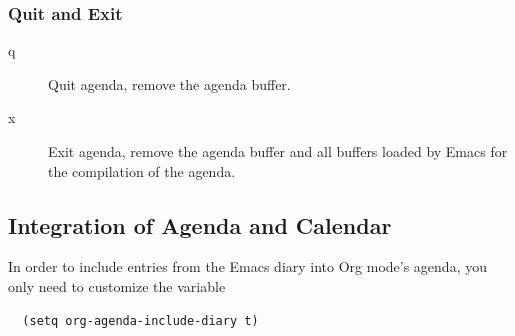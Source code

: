 \subsubsection{Quit and Exit}
\begin{description}
\item [q] Quit agenda, remove the agenda buffer.
\item [x] Exit agenda, remove the agenda buffer and all buffers loaded by Emacs for the compilation of the agenda.
\end{description}
    

\subsection{Integration of Agenda and Calendar}
In order to include entries from the Emacs diary into Org mode's agenda, you only need to customize the variable
\lstset{language=Lisp}
\begin{lstlisting}
  (setq org-agenda-include-diary t)
\end{lstlisting}